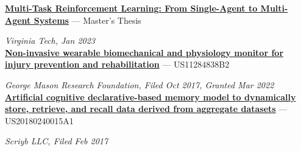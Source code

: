
\href{https://vtechworks.lib.vt.edu/items/bcd82abe-909b-4b69-9313-caa6b431e45b}{\textbf{Multi-Task Reinforcement Learning: From Single-Agent to Multi-Agent Systems}} --- Master's Thesis

\textit{Virginia Tech, Jan 2023} \\


\href{https://patents.google.com/patent/US11284838B2/en?inventor=matthew+trang&oq=matthew+trang}{\textbf{Non-invasive wearable biomechanical and physiology monitor for injury prevention and rehabilitation}} --- US11284838B2

\textit{George Mason Research Foundation, Filed Oct 2017, Granted Mar 2022} \\

\href{https://patents.google.com/patent/US20180240015A1/en?inventor=Matthew+Luu+Trang}{\textbf{Artificial cognitive declarative-based memory model to dynamically store, retrieve, and recall data derived from aggregate datasets}} --- US20180240015A1

\textit{Scriyb LLC, Filed Feb 2017} \\


